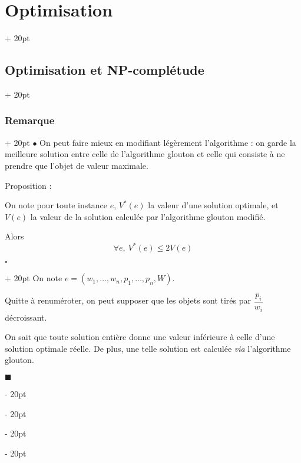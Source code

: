\documentclass[a4paper, 12pt, twoside]{article}
\renewcommand{\le}{\leqslant}
\newcommand{\ind}[1][20pt]{\advance\leftskip + #1}
\newcommand{\deind}[1][20pt]{\advance\leftskip - #1}
\newenvironment{indt}[2][20pt]{#2 \par \ind[#1]}{\par \deind} %
\newenvironment{proof}[1][{}]{\begin{indt}{$\square$ #1}}{$\blacksquare$ \end{indt}}
\newcommand{\1}{\mathbbm 1}
\begin{document}
\begin{indt}{\section{Optimisation}}
\begin{indt}{\subsection{Optimisation et \textbf{NP}-complétude}}
\begin{indt}{\subsubsection{Remarque}}
                $\bullet$ On peut faire mieux en modifiant légèrement l'algorithme : on garde la meilleure solution entre celle de l'algorithme glouton et celle qui consiste à ne prendre que l'objet de valeur maximale.

                \vspace{6pt}
                
                Proposition :
                \begin{emphBox}
                    On note pour toute instance $e$, $V^*(e)$ la valeur d'une solution optimale, et $V(e)$ la valeur de la solution calculée par l'algorithme glouton modifié.

                    Alors
                    \[
                        \forall e,\ V^*(e) \le 2V(e)
                    \]
                \end{emphBox}

                \vspace{6pt}
                
                \begin{proof}
                    On note $e = (w_1, \ldots, w_n, p_1, \ldots, p_n, W)$.

                    Quitte à renuméroter, on peut supposer que les objets sont tirés par $\dfrac{p_i}{w_i}$ décroissant.

                    On sait que toute solution entière donne une valeur inférieure à celle d'une solution optimale réelle.
                    De plus, une telle solution est calculée \textit{via} l'algorithme glouton.


\end{proof}
\end{indt}
\end{indt}
\end{indt}
\end{document}
